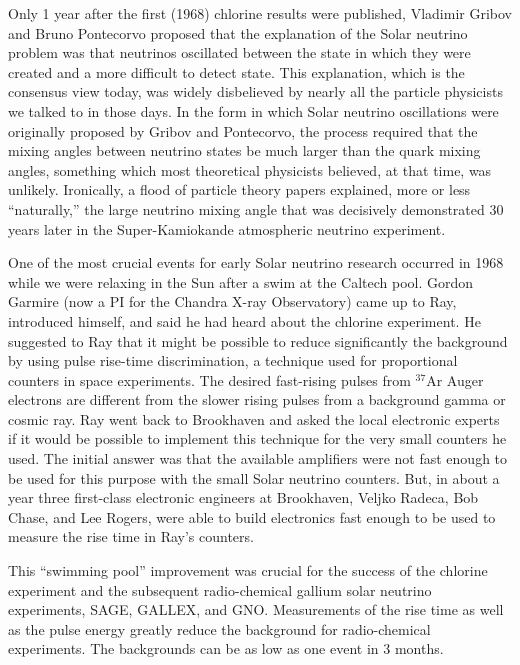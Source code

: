 \documentclass[a4paper,10pt]{article}
\begin{document}
{\noindent}Only 1 year after the first (1968) chlorine results were published, Vladimir Gribov and Bruno Pontecorvo proposed that the explanation of the Solar neutrino problem was that neutrinos oscillated between the state in which they were created and a more difficult to detect state. This explanation, which is the consensus view today, was widely disbelieved by nearly all the particle physicists we talked to in those days. In the form in which Solar neutrino oscillations were originally proposed by Gribov and Pontecorvo, the process required that the mixing angles between neutrino states be much larger than the quark mixing angles, something which most theoretical physicists believed, at that time, was unlikely. Ironically, a flood of particle theory papers explained, more or less ``naturally,'' the large neutrino mixing angle that was decisively demonstrated 30 years later in the Super-Kamiokande atmospheric neutrino experiment.

{\noindent}One of the most crucial events for early Solar neutrino research occurred in 1968 while we were relaxing in the Sun after a swim at the Caltech pool. Gordon Garmire (now a PI for the Chandra X-ray Observatory) came up to Ray, introduced himself, and said he had heard about the chlorine experiment. He suggested to Ray that it might be possible to reduce significantly the background by using pulse rise-time discrimination, a technique used for proportional counters in space experiments. The desired fast-rising pulses from $^{37}$Ar Auger electrons are different from the slower rising pulses from a background gamma or cosmic ray. Ray went back to Brookhaven and asked the local electronic experts if it would be possible to implement this technique for the very small counters he used. The initial answer was that the available amplifiers were not fast enough to be used for this purpose with the small Solar neutrino counters. But, in about a year three first-class electronic engineers at Brookhaven, Veljko Radeca, Bob Chase, and Lee Rogers, were able to build electronics fast enough to be used to measure the rise time in Ray's counters.

{\noindent}This ``swimming pool'' improvement was crucial for the success of the chlorine experiment and the subsequent radio-chemical gallium solar neutrino experiments, SAGE, GALLEX, and GNO. Measurements of the rise time as well as the pulse energy greatly reduce the background for radio-chemical experiments. The backgrounds can be as low as one event in 3 months. 
\end{document}

